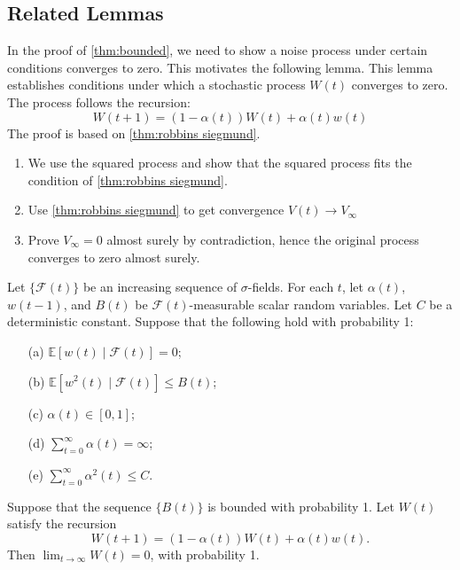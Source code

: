 \subsection{Related Lemmas}
In the proof of \autoref{thm:bounded}, we need to show a noise process under certain conditions converges to zero. This motivates the following lemma. This lemma establishes conditions under which a stochastic process $W(t)$ converges to zero. The process follows the recursion:
$$
W(t+1) = (1-\alpha(t))W(t)  +\alpha(t) w(t)
$$
The proof is based on \autoref{thm:robbins siegmund}.
\begin{enumerate}
    \item We use the squared process and show that the squared process fits the condition of \autoref{thm:robbins siegmund}.
    \item Use \autoref{thm:robbins siegmund} to get convergence $V(t) \to V_\infty$
    \item Prove $V_\infty=0$ almost surely by contradiction, hence the original process converges to zero almost surely.
\end{enumerate}
\begin{lemma}\label{lm:1}
Let $\{\mathcal{F}(t)\}$ be an increasing sequence of $\sigma$-fields. For each $t$, let $\alpha(t)$, $w(t-1)$, and $B(t)$ be $\mathcal{F}(t)$-measurable scalar random variables. Let $C$ be a deterministic constant. Suppose that the following hold with probability 1:
\begin{enumerate}
\item[(a)] $\mathbb{E}[w(t) \mid \mathcal{F}(t)] = 0$;
\item[(b)] $\mathbb{E}[w^2(t) \mid \mathcal{F}(t)] \leq B(t)$;
\item[(c)] $\alpha(t) \in [0,1]$;
\item[(d)] $\sum_{t=0}^{\infty} \alpha(t) = \infty$;
\item[(e)] $\sum_{t=0}^{\infty} \alpha^2(t) \leq C$.
\end{enumerate}
Suppose that the sequence $\{B(t)\}$ is bounded with probability 1. Let $W(t)$ satisfy the recursion
\begin{equation}
W(t+1) = (1 - \alpha(t))W(t) + \alpha(t)w(t).
\end{equation}
Then $\lim_{t \to \infty} W(t) = 0$, with probability 1.
\end{lemma}

